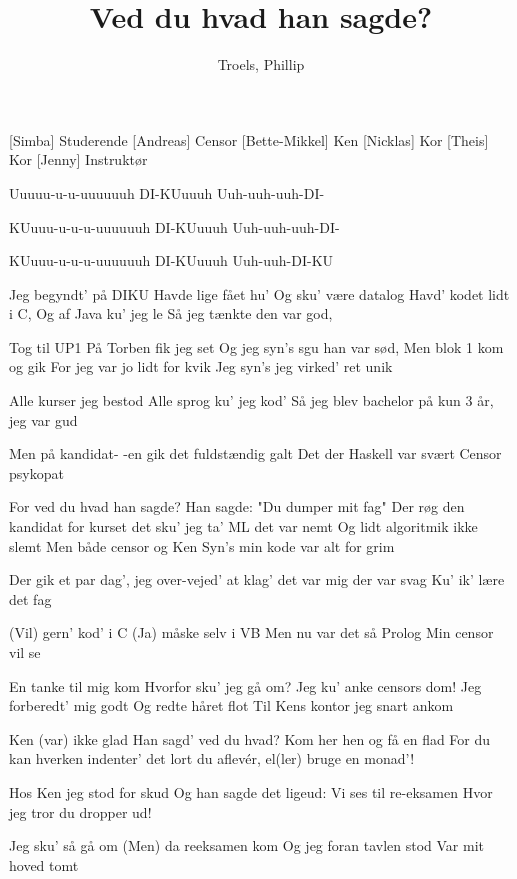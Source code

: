 \documentclass[a4paper,11pt]{article}
\title{Ved du hvad han sagde?}
\author{Troels, Phillip}
\begin{document}
\maketitle

\begin{roles}
[Simba] Studerende
[Andreas] Censor
[Bette-Mikkel] Ken
[Nicklas] Kor
[Theis] Kor
[Jenny] Instruktør
\end{roles}

\begin{song}
Uuuuu-u-u-uuuuuuh
DI-KUuuuh
Uuh-uuh-uuh-DI-

KUuuu-u-u-u-uuuuuuh
DI-KUuuuh
Uuh-uuh-uuh-DI-

KUuuu-u-u-u-uuuuuuh
DI-KUuuuh
Uuh-uuh-DI-KU

Jeg begyndt' på DIKU
Havde lige fået hu'
Og sku' være datalog
Havd' kodet lidt i C,
Og af Java ku' jeg le
Så jeg tænkte den var god,

Tog til UP1
På Torben fik jeg set
Og jeg syn's sgu han var sød,
Men blok 1 kom og gik
For jeg var jo lidt for kvik
Jeg syn's jeg virked' ret unik

Alle kurser jeg bestod
Alle sprog ku' jeg kod'
Så jeg blev bachelor på
kun 3 år, jeg var gud

Men på kandidat-
-en gik det fuldstændig galt
Det der Haskell var svært
Censor psykopat

For ved du hvad han sagde?
Han sagde:
 "Du dumper mit fag"
 Der røg den kandidat for
kurset det sku' jeg ta'
ML det var nemt
Og lidt algoritmik ikke slemt
Men både censor og Ken
Syn's min kode var alt for grim

Der gik et par dag',
jeg over-vejed' at klag'
det var mig der var svag
Ku' ik' lære det fag

(Vil) gern' kod' i C
(Ja) måske selv i VB
Men nu var det så Prolog
Min censor vil se

En tanke til mig kom
Hvorfor sku' jeg gå om?
Jeg ku' anke censors dom!
Jeg forberedt' mig godt
Og redte håret flot
Til Kens kontor jeg snart ankom

Ken (var) ikke glad
Han sagd'
 ved du hvad?
Kom her hen og få en flad
For du kan hverken indenter'
det lort du aflevér,
el(ler) bruge en monad'!

Hos Ken jeg stod for skud
Og han sagde det ligeud:
Vi ses til re-eksamen
Hvor jeg tror du dropper ud!

Jeg sku' så gå om
(Men) da reeksamen kom
Og jeg foran tavlen stod
Var mit hoved tomt


\end{song}
\end{document}
